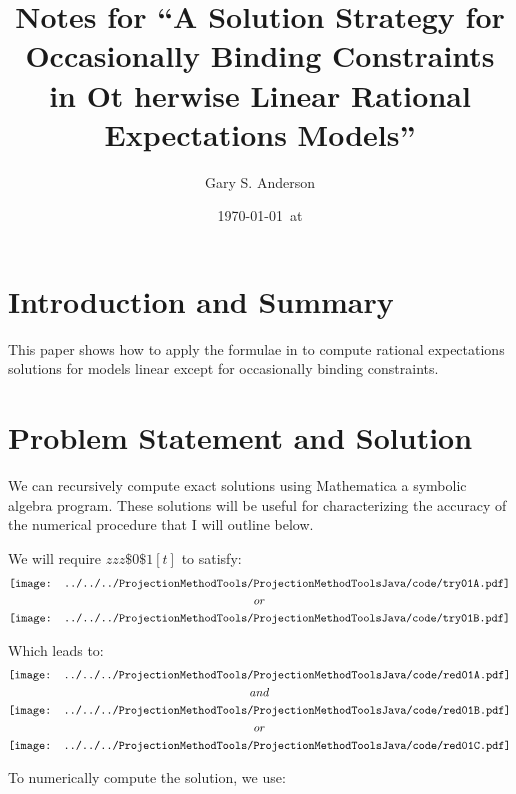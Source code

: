 \documentclass[12pt]{article}
\title{Notes for ``A Solution Strategy for Occasionally Binding Constraints in Ot
herwise
Linear Rational Expectations Models''}
\author{Gary S. Anderson}
\date{\today \   at \currenttime}
\begin{document}
\maketitle


\section{Introduction and Summary}
\label{sec:introduction-summary}

This paper shows how to apply the formulae in\citep{anderson10} to compute 
rational expectations solutions for models linear except for occasionally binding constraints.

\section{Problem Statement and Solution}
\label{sec:probl-stat-solut}




We can recursively compute exact solutions using
Mathematica a symbolic algebra program.  These solutions will be useful for
characterizing the accuracy of the numerical procedure that I will outline
below.

We will require $zzz\$0\$1[t]$ to satisfy:
 \begin{gather*}
\vcenter{\hbox{\texttt{[image: ../../../ProjectionMethodTools/ProjectionMethodToolsJava/code/try01A.pdf]}}}\\
or\\
\vcenter{\hbox{\texttt{[image: ../../../ProjectionMethodTools/ProjectionMethodToolsJava/code/try01B.pdf]}}}\\
 \end{gather*}


Which leads to:
 \begin{gather*}
\vcenter{\hbox{\texttt{[image: ../../../ProjectionMethodTools/ProjectionMethodToolsJava/code/red01A.pdf]}}}\\
and\\
\vcenter{\hbox{\texttt{[image: ../../../ProjectionMethodTools/ProjectionMethodToolsJava/code/red01B.pdf]}}}\\
or\\
\vcenter{\hbox{\texttt{[image: ../../../ProjectionMethodTools/ProjectionMethodToolsJava/code/red01C.pdf]}}}
 \end{gather*}



To numerically compute the solution, we use:
\end{document}
